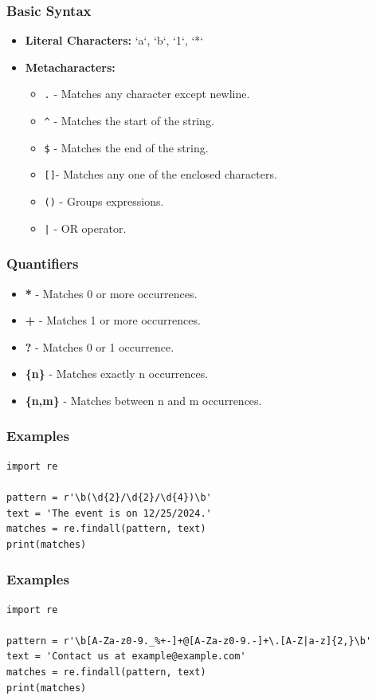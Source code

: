 \documentclass{beamer}
\begin{document}
\begin{frame}
    \frametitle{Basic Syntax}
    \begin{itemize}
        \item \textbf{Literal Characters:} `a`, `b`, `1`, `*`
        \item \textbf{Metacharacters:}
        \begin{itemize}
            \item \texttt{.} - Matches any character except newline.
            \item \texttt{^} - Matches the start of the string.
            \item \texttt{\$} - Matches the end of the string.
            \item \texttt{[]}- Matches any one of the enclosed characters.
            \item \texttt{()} - Groups expressions.
            \item \texttt{|} - OR operator.
        \end{itemize}
    \end{itemize}
\end{frame}

\begin{frame}
    \frametitle{Quantifiers}
    \begin{itemize}
        \item \textbf{*} - Matches 0 or more occurrences.
        \item \textbf{+} - Matches 1 or more occurrences.
        \item \textbf{?} - Matches 0 or 1 occurrence.
        \item \textbf{\{n\}} - Matches exactly n occurrences.
        \item \textbf{\{n,m\}} - Matches between n and m occurrences.
    \end{itemize}
\end{frame}

\begin{frame}[fragile]
    \frametitle{Examples}
    \begin{lstlisting}[style=pythonStyle, caption=Using Regular Expressions]
import re

pattern = r'\b(\d{2}/\d{2}/\d{4})\b'
text = 'The event is on 12/25/2024.'
matches = re.findall(pattern, text)
print(matches)
    \end{lstlisting}
\end{frame}

\begin{frame}[fragile]
    \frametitle{Examples}
    \begin{lstlisting}[style=pythonStyle, caption=Matching Email Addresses]
import re

pattern = r'\b[A-Za-z0-9._%+-]+@[A-Za-z0-9.-]+\.[A-Z|a-z]{2,}\b'
text = 'Contact us at example@example.com'
matches = re.findall(pattern, text)
print(matches)
    \end{lstlisting}
\end{frame}
\end{document}
